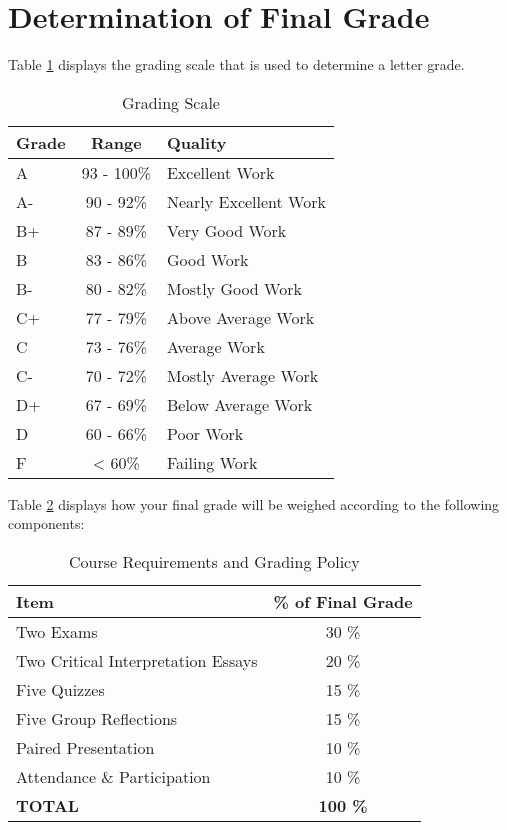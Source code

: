 \documentclass[11pt,]{article}
\begin{document}
\hypertarget{determination-of-final-grade}{%
\section{Determination of Final
Grade}\label{determination-of-final-grade}}

Table \ref{tab:grade_scale} displays the grading scale that is used to
determine a letter grade.

\renewcommand{\arraystretch}{1.5}

\begin{table}[!h]

\caption{\label{tab:grade_scale}Grading Scale}
\centering
\fontsize{10}{12}\selectfont
\begin{tabular}[t]{l|c|l}
\hline
\textbf{Grade} & \textbf{Range} & \textbf{Quality}\\
\hline
A & 93 - 100\% & Excellent Work\\
\hline
A- & 90 - 92\% & Nearly Excellent Work\\
\hline
B+ & 87 - 89\% & Very Good Work\\
\hline
B & 83 - 86\% & Good Work\\
\hline
B- & 80 - 82\% & Mostly Good Work\\
\hline
C+ & 77 - 79\% & Above Average Work\\
\hline
C & 73 - 76\% & Average Work\\
\hline
C- & 70 - 72\% & Mostly Average Work\\
\hline
D+ & 67 - 69\% & Below Average Work\\
\hline
D & 60 - 66\% & Poor Work\\
\hline
F & < 60\% & Failing Work\\
\hline
\end{tabular}
\end{table}

Table \ref{tab:weight_table} displays how your final grade will be
weighed according to the following components:

\renewcommand{\arraystretch}{1.5}

\begin{table}[!h]

\caption{\label{tab:weight_table}Course Requirements and Grading Policy}
\centering
\fontsize{10}{12}\selectfont
\begin{tabular}[t]{lc}
\toprule
\textbf{Item} & \textbf{\% of Final Grade}\\
\midrule
Two Exams & 30 \%\\
Two Critical Interpretation Essays & 20 \%\\
Five Quizzes & 15 \%\\
Five Group Reflections & 15 \%\\
Paired Presentation & 10 \%\\
Attendance \& Participation & 10 \%\\
\textbf{TOTAL} & \textbf{100 \%}\\
\midrule
\bottomrule
\end{tabular}
\end{table}
\end{document}
